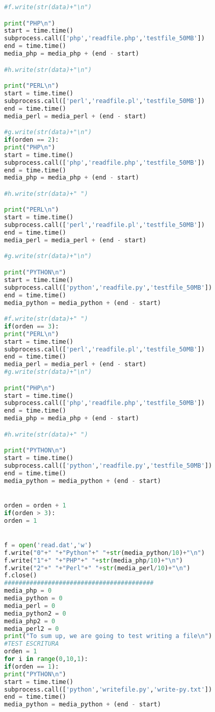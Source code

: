 \begin{lstlisting}[language=python]
#f.write(str(data)+"\n")

print("PHP\n")
start = time.time()
subprocess.call(['php','readfile.php','testfile_50MB'])
end = time.time()
media_php = media_php + (end - start)

#h.write(str(data)+"\n")

print("PERL\n")
start = time.time()
subprocess.call(['perl','readfile.pl','testfile_50MB'])
end = time.time()
media_perl = media_perl + (end - start)

#g.write(str(data)+"\n")
if(orden == 2):
print("PHP\n")
start = time.time()
subprocess.call(['php','readfile.php','testfile_50MB'])
end = time.time()
media_php = media_php + (end - start)

#h.write(str(data)+" ")

print("PERL\n")
start = time.time()
subprocess.call(['perl','readfile.pl','testfile_50MB'])
end = time.time()
media_perl = media_perl + (end - start)

#g.write(str(data)+"\n")

print("PYTHON\n")
start = time.time()
subprocess.call(['python','readfile.py','testfile_50MB'])
end = time.time()
media_python = media_python + (end - start)

#f.write(str(data)+" ")
if(orden == 3):
print("PERL\n")
start = time.time()
subprocess.call(['perl','readfile.pl','testfile_50MB'])
end = time.time()
media_perl = media_perl + (end - start)
#g.write(str(data)+"\n")

print("PHP\n")
start = time.time()
subprocess.call(['php','readfile.php','testfile_50MB'])
end = time.time()
media_php = media_php + (end - start)

#h.write(str(data)+" ")

print("PYTHON\n")
start = time.time()
subprocess.call(['python','readfile.py','testfile_50MB'])
end = time.time()
media_python = media_python + (end - start)


orden = orden + 1
if(orden > 3):
orden = 1


f = open('read.dat','w')
f.write("0"+" "+"Python"+" "+str(media_python/10)+"\n")
f.write("1"+" "+"PHP"+" "+str(media_php/10)+"\n")
f.write("2"+" "+"Perl"+" "+str(media_perl/10)+"\n")
f.close()
#########################################
media_php = 0
media_python = 0
media_perl = 0
media_python2 = 0
media_php2 = 0
media_perl2 = 0
print("To sum up, we are going to test writing a file\n")
#TEST ESCRITURA
orden = 1
for i in range(0,10,1):
if(orden == 1):
print("PYTHON\n")
start = time.time()
subprocess.call(['python','writefile.py','write-py.txt'])
end = time.time()
media_python = media_python + (end - start)


\end{lstlisting}
